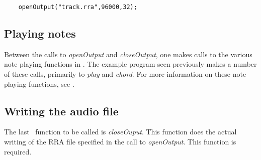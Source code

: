 \documentclass{article}
\begin{document}
\begin{verbatim}
    openOutput("track.rra",96000,32);
\end{verbatim}

\subsection*{Playing notes}

Between the calls to {\it openOutput} and {\it closeOutput},
one makes calls to
the various note playing functions in \songlib. The example program
seen previously makes a number of these calls, primarily to {\it play} and
{\it chord}. For more information on these note playing functions,
see 
.


\subsection*{Writing the audio file}

The last \songlib\ function to be called is {\it closeOuput}. This function
does the actual writing of the {\sc RRA} file specified in the call to
{\it openOutput}. This function is required.
\end{document}
